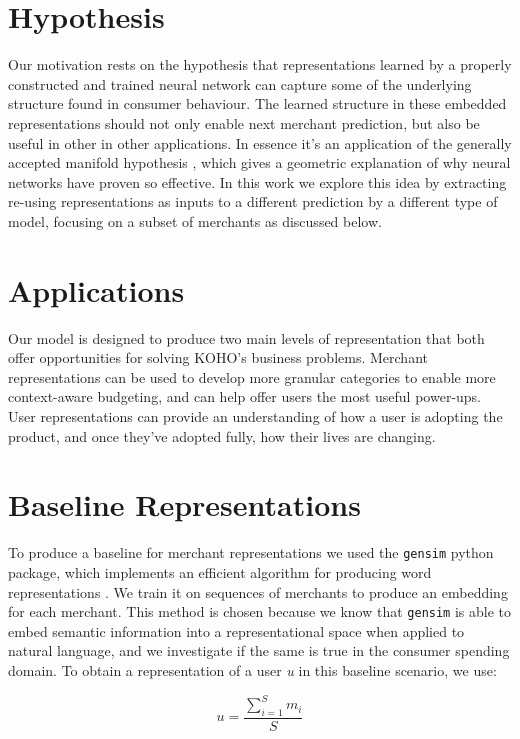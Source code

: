 \documentclass{article}
\begin{document}
\section{Hypothesis}
Our motivation rests on the hypothesis that representations learned by a properly constructed and trained neural network can capture some of the underlying structure found in consumer behaviour. The learned structure in these embedded representations should not only enable next merchant prediction, but also be useful in other in other applications. In essence it's an application of the generally accepted manifold hypothesis \cite{Fefferman:2013}, which gives a geometric explanation of why neural networks have proven so effective. In this work we explore this idea by extracting re-using representations as inputs to a different prediction by a different type of model, focusing on a subset of merchants as discussed below.

\section{Applications}
Our model is designed to produce two main levels of representation that both offer opportunities for solving KOHO’s business problems. Merchant representations can be used to develop more granular categories to enable more context-aware budgeting, and can help offer users the most useful power-ups. User representations can provide an understanding of how a user is adopting the product, and once they’ve adopted fully, how their lives are changing.

\section{Baseline Representations}
To produce a baseline for merchant representations we used the \texttt{gensim} python package, which implements an efficient algorithm for producing word representations \cite{Mikolov:2013}. We train it on sequences of merchants to produce an embedding for each merchant. This method is chosen because we know that \texttt{gensim} is able to embed semantic information into a representational space when applied to natural language, and we investigate if the same is true in the consumer spending domain. To obtain a representation of a user \textit{u} in this baseline scenario, we use: 

\begin{equation}
  u=\frac{\sum_{i=1}^S m_i}{S}
\end{equation}
\end{document}
